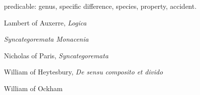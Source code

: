 \documentclass{article}
\begin{document}
predicable: genus, specific difference, species, property, accident.





Lambert of Auxerre, {\em Logica} \cite[pp.~102--162]{CTMPT}

{\em Syncategoremata Monacenia} \cite[pp.~163--173]{CTMPT}

Nicholas of Paris, {\em Syncategoremata} \cite[pp.~174--215]{CTMPT}

William of Heytesbury, {\em De sensu composito et divido} \cite[pp.~413--434]{CTMPT}

William of Ockham \cite[p.~79]{grant}





\end{document}
